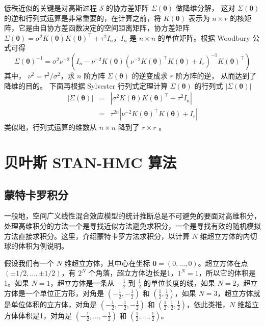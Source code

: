 \documentclass[12pt,a4paper,UTF8,twoside]{book}
\theoremstyle{definition}
\theoremstyle{definition}
\theoremstyle{definition}
\theoremstyle{remark}
\begin{document}
低秩近似的关键是对高斯过程 \(\mathcal{S}\) 的协方差矩阵
\(\Sigma(\boldsymbol{\theta})\) 做降维分解， 这对
\(\Sigma(\boldsymbol{\theta})\)
的逆和行列式运算是非常重要的，在计算之前，将 \(K(\boldsymbol{\theta})\)
表示为 \(n\times r\)
的核矩阵，它是由自协方差函数决定的空间距离矩阵，协方差矩阵
\(\Sigma(\boldsymbol{\theta}) = \sigma^2K(\boldsymbol{\theta})K(\boldsymbol{\theta})^{\top}+\tau^2 I_{n}\)，\(I_{n}\)
是 \(n\times n\) 的单位矩阵。根据 Woodbury 公式可得
\[\Sigma(\boldsymbol{\theta})^{-1} = \sigma^2\nu^{-2}(I_{n}-\nu^{-2}K(\boldsymbol{\theta})(\nu^{-2}K(\boldsymbol{\theta})^{\top} K(\boldsymbol{\theta})+I_{r})^{-1}K(\boldsymbol{\theta})^{\top})\]
其中， \(\nu^2 = \tau^2/\sigma^2\)，求 \(n\) 阶方阵
\(\Sigma(\boldsymbol{\theta})\) 的逆变成求 \(r\) 阶方阵的逆，
从而达到了降维的目的。 下面再根据 Sylvester 行列式定理计算
\(\Sigma(\boldsymbol{\theta})\) 的行列式
\(|\Sigma(\boldsymbol{\theta})|\) \begin{eqnarray*}
|\Sigma(\boldsymbol{\theta})| & = & |\sigma^2K(\boldsymbol{\theta})K(\boldsymbol{\theta})^{\top}+\tau^2 I_{n}| \\ 
                 & = & \tau^{2n}|\nu^{-2}K(\boldsymbol{\theta})^{\top} K(\boldsymbol{\theta})+I_{r}|
\end{eqnarray*} \noindent 类似地，行列式运算的维数从 \(n\times n\)
降到了 \(r\times r\) \citep{Diggle2007}。

\hypertarget{sec:stan-hmc}{%
\section{贝叶斯 STAN-HMC 算法}\label{sec:stan-hmc}}

\hypertarget{subsec:Curse-of-Dimensionality}{%
\subsection{蒙特卡罗积分}\label{subsec:Curse-of-Dimensionality}}

一般地，空间广义线性混合效应模型的统计推断总是不可避免的要面对高维积分，处理高维积分的方法一个是寻找近似方法避免求积分，一个是寻找有效的随机模拟方法直接求积分。这里，介绍蒙特卡罗方法求积分，以计算
\(N\) 维超立方体的内切球的体积为例说明。

假设我们有一个 \(N\) 维超立方体，其中心在坐标
\(\mathbf{0} = (0,\ldots,0)\)。超立方体在点
\((\pm 1/2,\ldots,\pm 1/2)\)，有 \(2^{N}\)
个角落，超立方体边长是1，\(1^{N}=1\)，所以它的体积是1。如果
\(N=1\)，超立方体是一条从 \(-\frac{1}{2}\) 到 \(\frac{1}{2}\)
的单位长度的线，如果 \(N=2\)，超立方体是一个单位正方形，对角是
\(\left( -\frac{1}{2}, -\frac{1}{2} \right)\) 和
\(\left( \frac{1}{2}, \frac{1}{2} \right)\)，如果
\(N=3\)，超立方体就是单位体积的立方体，对角是
\(\left( -\frac{1}{2}, -\frac{1}{2}, -\frac{1}{2} \right)\) 和
\(\left( \frac{1}{2}, \frac{1}{2}, \frac{1}{2} \right)\)，依此类推，\(N\)
维超立方体体积是1，对角是
\(\left( -\frac{1}{2}, \ldots, -\frac{1}{2} \right)\) 和
\(\left( \frac{1}{2}, \ldots, \frac{1}{2} \right)\)。
\end{document}
